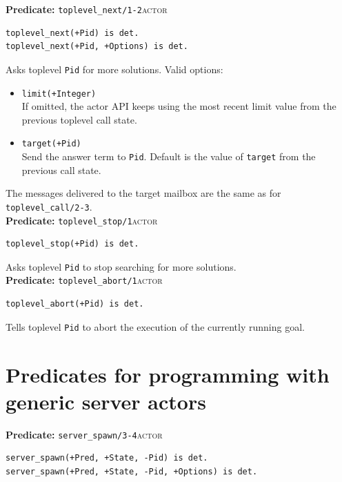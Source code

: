 \noindent \textbf{Predicate:} \texttt{toplevel\_next/1-2}\hfill\textsc{actor}

\begin{verbatim}
toplevel_next(+Pid) is det.
toplevel_next(+Pid, +Options) is det.
\end{verbatim}

\noindent Asks toplevel \texttt{Pid} for more solutions. Valid options:

\begin{itemize}
\item
  \texttt{limit(+Integer)}\\
  If omitted, the actor API keeps using the most recent limit value from the
  previous toplevel call state.
\item
  \texttt{target(+Pid)}\\
  Send the answer term to \texttt{Pid}. Default is the value of
  \texttt{target} from the previous call state.
\end{itemize}

\noindent The messages delivered to the target mailbox are the same as for
\texttt{toplevel\_call/2-3}.\\

\noindent \textbf{Predicate:} \texttt{toplevel\_stop/1}\hfill\textsc{actor}

\begin{verbatim}
toplevel_stop(+Pid) is det.
\end{verbatim}

\noindent Asks toplevel \texttt{Pid} to stop searching for more solutions.\\

\noindent \textbf{Predicate:} \texttt{toplevel\_abort/1}\hfill\textsc{actor}

\begin{verbatim}
toplevel_abort(+Pid) is det.
\end{verbatim}

\noindent Tells toplevel \texttt{Pid} to abort the execution of the currently
running goal.\\

\section{Predicates for programming with generic server actors}\label{sec:server-api}

\noindent \textbf{Predicate:} \texttt{server\_spawn/3-4}\hfill\textsc{actor}

\begin{verbatim}
server_spawn(+Pred, +State, -Pid) is det.
server_spawn(+Pred, +State, -Pid, +Options) is det.
\end{verbatim}

